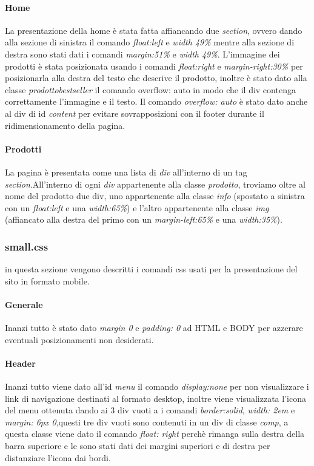 \paragraph{Home} \mbox{}
La presentazione della home è stata fatta affiancando due \emph{section}, ovvero dando alla sezione di sinistra il comando \emph{float:left} e \emph{width 49\%} mentre alla sezione di destra sono stati dati i comandi \emph{margin:51\%} e \emph{width 49\%}. 
L'immagine dei prodotti è stata posizionata usando i comandi \emph{float:right} e \emph{margin-right:30\%} per posizionarla alla destra del testo che descrive il prodotto, inoltre è stato dato alla classe \emph{prodottobestseller} il comando overflow: auto in modo che il div contenga correttamente l'immagine e il testo.
Il comando \emph{overflow: auto} è stato dato anche al div di id \emph{content} per evitare sovrapposizioni con il footer durante il ridimensionamento della pagina.

\paragraph{Prodotti} \mbox{}
La pagina è presentata come una lista di \emph{div} all'interno di un tag \emph{section}.\newline All'interno di ogni \emph{div} appartenente alla classe \emph{prodotto}, troviamo oltre al nome del prodotto due div, uno appartenente alla classe \emph{info} (spostato a sinistra con un \emph{float:left} e una \emph{width:65\%}) e l'altro appartenente alla classe \emph{img} (affiancato alla destra del primo con un \emph{margin-left:65\%} e una \emph{width:35\%}). 


\subsubsection{small.css}
in questa sezione vengono descritti i comandi css usati per la presentazione del sito in formato mobile.

\paragraph{Generale} \mbox{}
Inanzi tutto è stato dato \emph{margin 0} e \emph{padding: 0} ad HTML e BODY per azzerare eventuali posizionamenti non desiderati. 

\paragraph{Header} \mbox{}
Inanzi tutto viene dato all'id \emph{menu} il comando \emph{display:none} per non visualizzare i link di navigazione destinati al formato desktop, inoltre viene visualizzata l'icona del menu ottenuta dando ai 3 div vuoti a i comandi \emph{border:solid}, \emph{width: 2em} e \emph{margin: 6px 0},questi tre div vuoti sono contenuti in un div di classe \emph{comp}, a questa classe viene dato il comando \emph{float: right} perchè rimanga sulla destra della barra superiore e le sono stati dati dei margini superiori e di destra per distanziare l'icona dai bordi.

